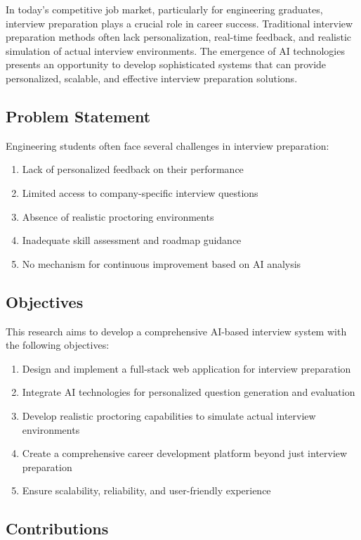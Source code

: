 \documentclass[12pt, conference]{IEEEtran}
\begin{document}
In today's competitive job market, particularly for engineering graduates, interview preparation plays a crucial role in career success. Traditional interview preparation methods often lack personalization, real-time feedback, and realistic simulation of actual interview environments. The emergence of AI technologies presents an opportunity to develop sophisticated systems that can provide personalized, scalable, and effective interview preparation solutions.

\subsection{Problem Statement}

Engineering students often face several challenges in interview preparation:
\begin{enumerate}
    \item Lack of personalized feedback on their performance
    \item Limited access to company-specific interview questions
    \item Absence of realistic proctoring environments
    \item Inadequate skill assessment and roadmap guidance
    \item No mechanism for continuous improvement based on AI analysis
\end{enumerate}

\subsection{Objectives}

This research aims to develop a comprehensive AI-based interview system with the following objectives:
\begin{enumerate}
    \item Design and implement a full-stack web application for interview preparation
    \item Integrate AI technologies for personalized question generation and evaluation
    \item Develop realistic proctoring capabilities to simulate actual interview environments
    \item Create a comprehensive career development platform beyond just interview preparation
    \item Ensure scalability, reliability, and user-friendly experience
\end{enumerate}

\subsection{Contributions}
\end{document}
